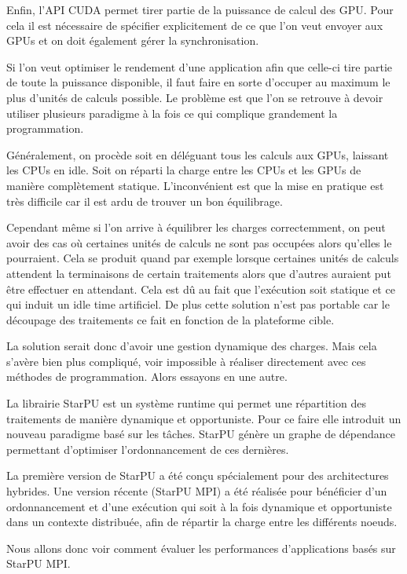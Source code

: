 \documentclass[smallextended]{svjour3}
\begin{document}
Enfin, l'API CUDA permet tirer partie de la puissance de calcul
des GPU. Pour cela il est nécessaire de spécifier explicitement de
ce que l'on veut envoyer aux GPUs et on doit également gérer la
synchronisation.  

Si l'on veut optimiser le rendement d'une application afin que
celle-ci tire partie de toute la puissance disponible, il faut faire
en sorte d'occuper au maximum le plus d'unités de calculs possible.  
Le problème est que l'on se retrouve à devoir utiliser plusieurs
paradigme à la fois ce qui complique grandement la programmation.

Généralement, on procède soit en déléguant tous les calculs aux
GPUs, laissant les CPUs en idle. Soit on réparti la charge entre les
CPUs et les GPUs de manière complètement statique. L'inconvénient
est que la mise en pratique est très difficile car il est ardu de
trouver un bon équilibrage.

Cependant même si l'on arrive à équilibrer les charges
correctemment, on peut avoir des cas où certaines unités de
calculs ne sont pas occupées alors qu'elles le pourraient. Cela se
produit quand par exemple lorsque certaines unités de calculs
attendent la terminaisons de certain traitements alors que
d'autres auraient put être effectuer en attendant. Cela est dû au
fait que l'exécution soit statique et ce qui induit un idle time
artificiel. De plus cette solution n'est pas portable car le
découpage des traitements ce fait en fonction de la plateforme
cible.

La solution serait donc d'avoir une gestion dynamique des
charges. Mais cela s'avère bien plus compliqué, voir impossible
à réaliser directement avec ces méthodes de programmation. Alors
essayons en une autre.

La librairie StarPU\cite{StarPU} est un système runtime qui permet
une répartition des traitements de manière dynamique et
opportuniste. Pour ce faire elle introduit un nouveau paradigme basé
sur les tâches. StarPU génère un graphe de dépendance permettant
d'optimiser l'ordonnancement de ces dernières. 

La première version de StarPU a été conçu spécialement pour des
architectures hybrides. Une version récente (StarPU MPI) a été
réalisée pour bénéficier d'un ordonnancement et d'une exécution qui
soit à la fois dynamique et opportuniste dans un contexte distribuée,
afin de répartir la charge entre les différents noeuds.

Nous allons donc voir comment évaluer les performances
d'applications basés sur StarPU MPI.
\end{document}
